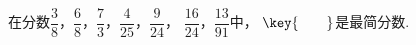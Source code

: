 在分数$\dfrac {3}{8}$，$\dfrac {6}{8}$，$\dfrac {7}{3}$，$\dfrac {4}{25}$，$\dfrac {9}{24}$，
$\dfrac {16}{24}$，$\dfrac {13}{91}$中， $\key{\qquad}$是最简分数.